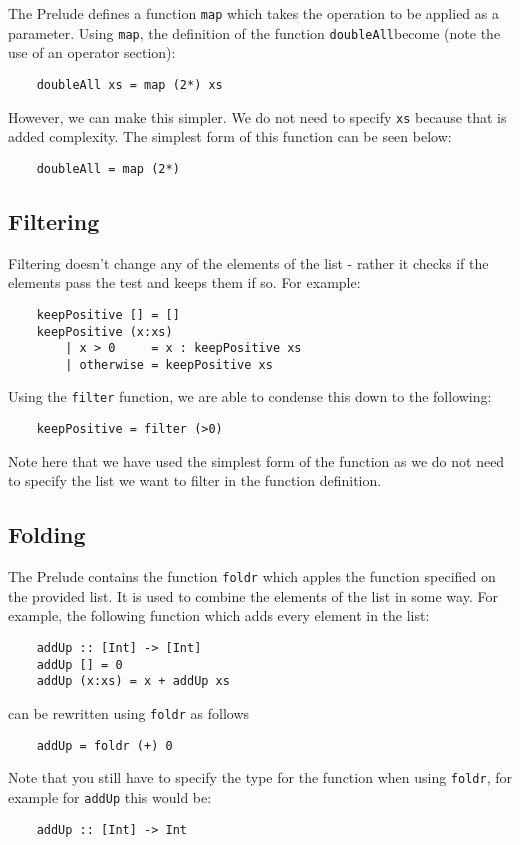 The Prelude defines a function \verb|map| which takes the operation to be applied as a parameter. Using \verb|map|, the definition of the function \verb|doubleAll|become (note the use of an operator section):
\begin{verbatim}
    doubleAll xs = map (2*) xs
\end{verbatim}
However, we can make this simpler. We do not need to specify \verb|xs| because that is added complexity. The simplest form of this function can be seen below:
\begin{verbatim}
    doubleAll = map (2*)
\end{verbatim}

\subsection{Filtering}
Filtering doesn't change any of the elements of the list - rather it checks if the elements pass the test and keeps them if so. For example:
\begin{verbatim}
    keepPositive [] = []
    keepPositive (x:xs)
        | x > 0     = x : keepPositive xs
        | otherwise = keepPositive xs
\end{verbatim}
Using the \verb|filter| function, we are able to condense this down to the following:
\begin{verbatim}
    keepPositive = filter (>0)
\end{verbatim}
Note here that we have used the simplest form of the function as we do not need to specify the list we want to filter in the function definition.

\subsection{Folding}
The Prelude contains the function \verb|foldr| which apples the function specified on the provided list. It is used to combine the elements of the list in some way. For example, the following function which adds every element in the list:
\begin{verbatim}
    addUp :: [Int] -> [Int]
    addUp [] = 0
    addUp (x:xs) = x + addUp xs
\end{verbatim}
can be rewritten using \verb|foldr| as follows
\begin{verbatim}
    addUp = foldr (+) 0
\end{verbatim}

Note that you still have to specify the type for the function when using \verb|foldr|, for example for \verb|addUp| this would be:
\begin{verbatim}
    addUp :: [Int] -> Int
\end{verbatim}